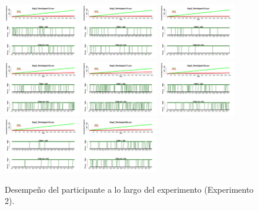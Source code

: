 \begin{figure}[th]
\includegraphics[width=0.30\textwidth]{Figures/Success_Exp2_P13} \includegraphics[width=0.30\textwidth]{Figures/Success_Exp2_P14} \includegraphics[width=0.30\textwidth]{Figures/Success_Exp2_P15}
\includegraphics[width=0.30\textwidth]{Figures/Success_Exp2_P16} \includegraphics[width=0.30\textwidth]{Figures/Success_Exp2_P17} \includegraphics[width=0.30\textwidth]{Figures/Success_Exp2_P18}
\includegraphics[width=0.30\textwidth]{Figures/Success_Exp2_P19} \includegraphics[width=0.30\textwidth]{Figures/Success_Exp2_P20} 
\caption[Success_Exp2]{Desempeño del participante a lo largo del experimento (Experimento 2).}
\label{fig:Success_E2}
\end{figure}

